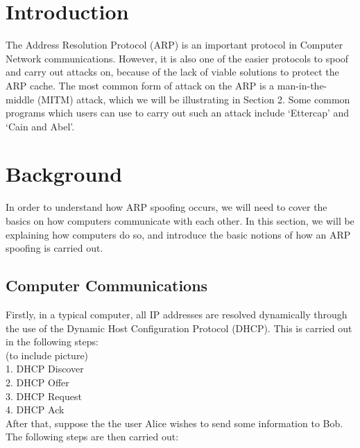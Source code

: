 \documentclass{acm_proc_article-sp}
\begin{document}




\section{Introduction}
The Address Resolution Protocol (ARP) is an important protocol in Computer Network communications. However, it is also one of the easier protocols to spoof and carry out attacks on, because of the lack of viable solutions to protect the ARP cache. The most common form of attack on the ARP is a man-in-the-middle (MITM) attack, which we will be illustrating in Section 2. Some common programs which users can use to carry out such an attack include `Ettercap' and `Cain and Abel'. 

\section{Background}
In order to understand how ARP spoofing occurs, we will need to cover the basics on how computers communicate with each other. In this section, we will be explaining how computers do so, and introduce the basic notions of how an ARP spoofing is carried out. 

\subsection{Computer Communications}
Firstly, in a typical computer, all IP addresses are resolved dynamically through the use of the Dynamic Host Configuration Protocol (DHCP). This is carried out in the following steps: \\
(to include picture) \\
1. DHCP Discover \\
2. DHCP Offer \\
3. DHCP Request \\
4. DHCP Ack \\ 

After that, suppose the the user Alice wishes to send some information to Bob. The following steps are then carried out: 
\end{document}
